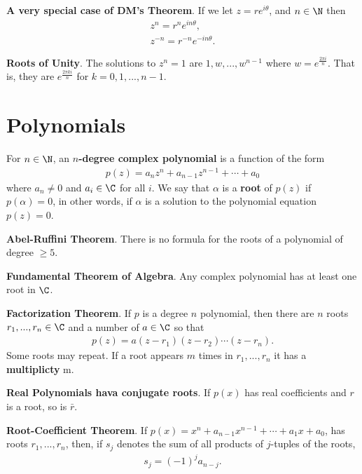 \documentclass{article}
\begin{document}
\begin{theorem}
    \textbf{A very special case of DM's Theorem}. If we let $z=re^{i\theta}$, and $n\in\N$ then
    \begin{align*}
        z^n = r^ne^{in\theta},\\
        z^{-n} = r^{-n}e^{-in\theta}.
    \end{align*}
\end{theorem}
\begin{theorem}
    \textbf{Roots of Unity}. The solutions to $z^n=1$ are $1,w,...,w^{n-1}$ where $w=e^{\frac{2\pi i}{n}}$. That is, they are $e^{\frac{2\pi ki}{n}}$ for $k=0,1,...,n-1$.
\end{theorem}
\section{Polynomials}
\begin{definition}
    For $n\in\N$, an \textbf{$n$-degree complex polynomial} is a function of the form
    \begin{align*}
        p(z)=a_nz^n+a_{n-1}z^{n-1}+\cdots+a_0
    \end{align*}
    where $a_n\not=0$ and $a_i\in\C$ for all $i$. We say that $\alpha$ is a \textbf{root} of $p(z)$ if $p(\alpha)=0$, in other words, if $\alpha$ is a solution to the polynomial equation $p(z)=0$.
\end{definition}
\begin{theorem}
    \textbf{Abel-Ruffini Theorem}. There is no formula for the roots of a polynomial of degree $\geq 5$.
\end{theorem}
\begin{theorem}
    \textbf{Fundamental Theorem of Algebra}. Any complex polynomial has at least one root in $\C$.
\end{theorem}
\begin{theorem}
    \textbf{Factorization Theorem}. If $p$ is a degree $n$ polynomial, then there are $n$ roots $r_1,...,r_n\in\C$ and a number of $a\in\C$ so that
    \begin{align*}
        p(z)=a(z-r_1)(z-r_2)\cdots(z-r_n).
    \end{align*}
    Some roots may repeat. If a root appears $m$ times in $r_1, ..., r_n$ it has a \textbf{multiplicty} m.
\end{theorem}
\begin{theorem}
    \textbf{Real Polynomials hava conjugate roots}. If $p(x)$ has real coefficients and $r$ is a root, so is $\bar{r}$.
\end{theorem}
\begin{theorem}
    \textbf{Root-Coefficient Theorem}. If $p(x)=x^n+a_{n-1}x^{n-1}+\cdots+a_1x+a_0$, has roots $r_1, ..., r_n$, then, if $s_j$ denotes the sum of all products of $j$-tuples of the roots,
    \begin{align*}
        s_j=(-1)^ja_{n-j}.
    \end{align*}
\end{theorem}
\end{document}
